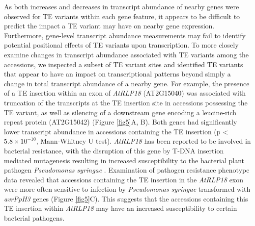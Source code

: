 \documentclass[12pt]{article}
\begin{document}
As both increases and decreases in transcript abundance of nearby
genes were observed for TE variants within each gene feature, it
appears to be difficult to predict the impact a TE variant may have on
nearby gene expression. Furthermore, gene-level transcript abundance
measurements may fail to identify potential positional effects of TE
variants upon transcription. To more closely examine changes in
transcript abundance associated with TE variants among the accessions,
we inspected a subset of TE variant sites and identified TE variants
that appear to have an impact on transcriptional patterns beyond
simply a change in total transcript abundance of a nearby gene. For
example, the presence of a TE insertion within an exon of
\emph{AtRLP18 }(AT2G15040) was associated with truncation of the
transcripts at the TE insertion site in accessions possessing the TE
variant, as well as silencing of a downstream gene encoding a
leucine-rich repeat protein (AT2G15042) (Figure \ref{fig5}A, B). Both
genes had significantly lower transcript abundance in accessions
containing the TE insertion (p \textless{} $5.8 \times10^{-10}$, Mann-Whitney U
test). \emph{AtRLP18 }has been reported to be involved in bacterial
resistance, with the disruption of this gene by T-DNA insertion
mediated mutagenesis resulting in increased susceptibility to the
bacterial plant pathogen \emph{Pseudomonas syringae}
\cite{Wang:2008km}. Examination of pathogen resistance phenotype data
\cite{Aranzana:2005cq} revealed that accessions containing the TE
insertion in the \emph{AtRLP18} exon were more often sensitive to
infection by \emph{Pseudomonas syringae} transformed with
\emph{avrPpH3} genes (Figure \ref{fig5}C). This suggests that the
accessions containing this TE insertion within \emph{AtRLP18} may have
an increased susceptibility to certain bacterial pathogens.
\end{document}
